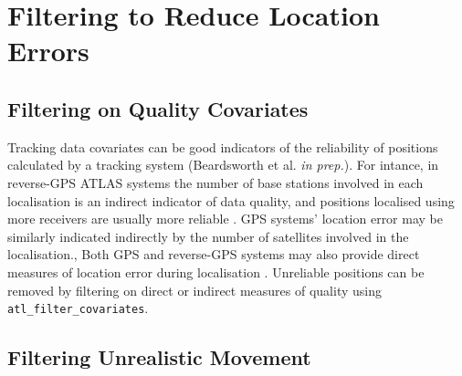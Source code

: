 \documentclass[10pt,paper=a4,headings=standardclasses
]{scrartcl}
\begin{document}
\section{Filtering to Reduce Location Errors}

\subsection{Filtering on Quality Covariates}

Tracking data covariates can be good indicators of the reliability of positions calculated by a tracking system (Beardsworth et al. \textit{in prep.}).
For intance, in reverse-GPS ATLAS systems the number of base stations involved in each localisation is an indirect indicator of data quality, and positions localised using more receivers are usually more reliable \citep[the minimum required for an ATLAS localisation is 3; see][]{weiser2016}.
GPS systems' location error may be similarly indicated indirectly by the number of satellites involved in the localisation., 
Both GPS and reverse-GPS systems may also provide direct measures of location error during localisation \citep{maccurdy2009, maccurdy2019, weiser2016}.
Unreliable positions can be removed by filtering on direct or indirect measures of quality using \texttt{atl\_filter\_covariates}.

\subsection{Filtering Unrealistic Movement}
\end{document}
